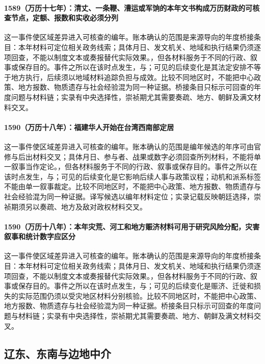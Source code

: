 \paragraph{1589（万历十七年）：清丈、一条鞭、漕运或军饷的本年文书构成万历财政的可核查节点，定额、报数和实收必须分列} 这一事件使区域差异进入可核查的编年。账本确认的范围是来源导向的年度桥接条目：本年材料可定位相关政务线索；具体月日、发文机关、地域和执行结果仍须逐项回查，不能以制度文本或奏报替代实际效果。，但各材料服务于不同的行政、叙事或保存目的。事件之所以在该时点发生，与；可见的后续变化是其法定安排不等于地方执行，后续须以地域材料追踪负担与成效。比较不同地区时，不能把中心政策、地方报数、物质遗存与社会经验混为同一种证据。桥接条目只标示可回查的年度问题与材料链；实录有中央选择性，崇祯期尤其需要奏疏、地方、朝鲜及满文材料交叉。

\paragraph{1590（万历十八年）：福建华人开始在台湾西南部定居} 这一事件使区域差异进入可核查的编年。账本确认的范围是编年候选的年序可由官修与后出材料交叉；具体月日、参与者、战果或数字必须回查所列材料，不能将单一叙事当作定论。，但各材料服务于不同的行政、叙事或保存目的。事件之所以在该时点发生，与；可见的后续变化是它影响后续人事与政策议程；动机和派系标签不能由单一叙事裁定。比较不同地区时，不能把中心政策、地方报数、物质遗存与社会经验混为同一种证据。译写候选以编年材料定位；实录记载反映朝廷选择，崇祯期须另以奏疏、地方及敌对政权材料交叉。

\paragraph{1590（万历十八年）：本年灾荒、河工和地方赈济材料可用于研究风险分配，灾害叙事和统计数字应区分} 这一事件使区域差异进入可核查的编年。账本确认的范围是来源导向的年度桥接条目：本年材料可定位相关政务线索；具体月日、发文机关、地域和执行结果仍须逐项回查，不能以制度文本或奏报替代实际效果。，但各材料服务于不同的行政、叙事或保存目的。事件之所以在该时点发生，与；可见的后续变化是赈济、迁徙和损失的实际范围仍须以受灾地区材料分别核验。比较不同地区时，不能把中心政策、地方报数、物质遗存与社会经验混为同一种证据。桥接条目只标示可回查的年度问题与材料链；实录有中央选择性，崇祯期尤其需要奏疏、地方、朝鲜及满文材料交叉。

\subsection{辽东、东南与边地中介}

